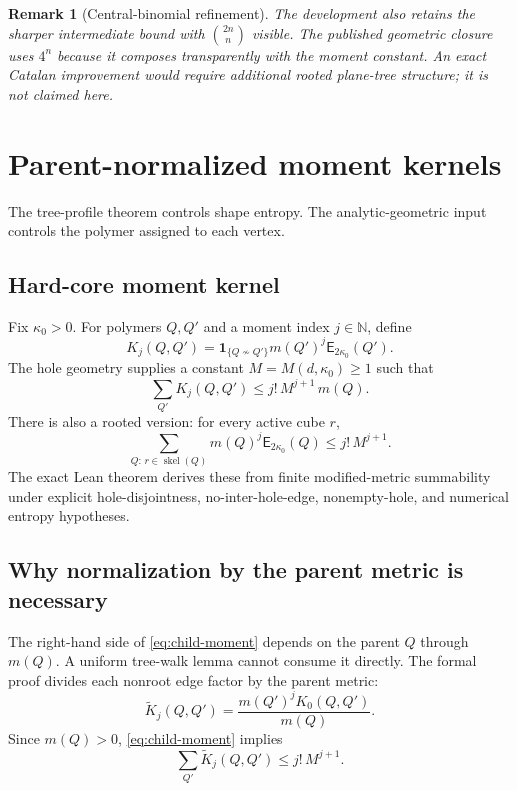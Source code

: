 \documentclass[11pt]{article}
\newtheorem{remark}[theorem]{Remark}
\newcommand{\N}{\mathbb N}
\newcommand{\one}{\mathbf 1}
\newcommand{\skel}{\operatorname{skel}}
\newcommand{\ExpW}{\mathsf E}
\newcommand{\incomp}{\not\sim}
\begin{document}
\begin{remark}[Central-binomial refinement]
The development also retains the sharper intermediate bound with $\binom{2n}{n}$ visible.  The published geometric closure uses $4^n$ because it composes transparently with the moment constant.  An exact Catalan improvement would require additional rooted plane-tree structure; it is not claimed here.
\end{remark}

\section{Parent-normalized moment kernels}

The tree-profile theorem controls shape entropy.  The analytic-geometric input controls the polymer assigned to each vertex.

\subsection{Hard-core moment kernel}

Fix $\kappa_0>0$.  For polymers $Q,Q'$ and a moment index $j\in\N$, define
\begin{equation}\label{eq:moment-kernel}
  K_j(Q,Q')
  =\one_{\{Q\incomp Q'\}}
    m(Q')^j\ExpW_{2\kappa_0}(Q').
\end{equation}
The hole geometry supplies a constant $M=M(d,\kappa_0)\ge1$ such that
\begin{equation}\label{eq:child-moment}
  \sum_{Q'}K_j(Q,Q')
  \le j!\,M^{j+1}\,m(Q).
\end{equation}
There is also a rooted version: for every active cube $r$,
\begin{equation}\label{eq:root-moment}
  \sum_{Q:\,r\in\skel(Q)}m(Q)^j\ExpW_{2\kappa_0}(Q)
  \le j!\,M^{j+1}.
\end{equation}
The exact Lean theorem derives these from finite modified-metric summability under explicit hole-disjointness, no-inter-hole-edge, nonempty-hole, and numerical entropy hypotheses.

\subsection{Why normalization by the parent metric is necessary}

The right-hand side of \cref{eq:child-moment} depends on the parent $Q$ through $m(Q)$.  A uniform tree-walk lemma cannot consume it directly.  The formal proof divides each nonroot edge factor by the parent metric:
\begin{equation}\label{eq:normalized-kernel}
  \widetilde K_j(Q,Q')
  =\frac{m(Q')^jK_0(Q,Q')}{m(Q)}.
\end{equation}
Since $m(Q)>0$, \cref{eq:child-moment} implies
\begin{equation}\label{eq:normalized-budget}
  \sum_{Q'}\widetilde K_j(Q,Q')
  \le j!\,M^{j+1}.
\end{equation}
\end{document}
